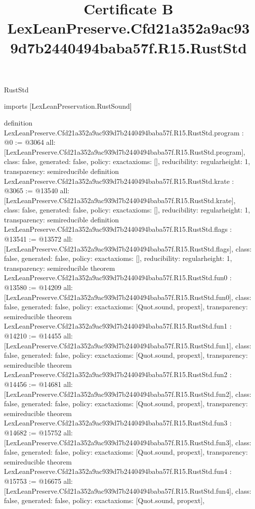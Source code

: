 \begin{lexlean}{RustStd}
\title{Certificate B LexLeanPreserve.Cfd21a352a9ac939d7b2440494baba57f.R15.RustStd}
\begin{coremodule}
imports [LexLeanPreservation.RustSound]

definition LexLeanPreserve.Cfd21a352a9ac939d7b2440494baba57f.R15.RustStd.program : @0 := @3064 {
  all: [LexLeanPreserve.Cfd21a352a9ac939d7b2440494baba57f.R15.RustStd.program],
  class: false,
  generated: false,
  policy: exact{axioms: []},
  reducibility: regular{height: 1},
  transparency: semireducible
}
definition LexLeanPreserve.Cfd21a352a9ac939d7b2440494baba57f.R15.RustStd.krate : @3065 := @13540 {
  all: [LexLeanPreserve.Cfd21a352a9ac939d7b2440494baba57f.R15.RustStd.krate],
  class: false,
  generated: false,
  policy: exact{axioms: []},
  reducibility: regular{height: 1},
  transparency: semireducible
}
definition LexLeanPreserve.Cfd21a352a9ac939d7b2440494baba57f.R15.RustStd.flags : @13541 := @13572 {
  all: [LexLeanPreserve.Cfd21a352a9ac939d7b2440494baba57f.R15.RustStd.flags],
  class: false,
  generated: false,
  policy: exact{axioms: []},
  reducibility: regular{height: 1},
  transparency: semireducible
}
theorem LexLeanPreserve.Cfd21a352a9ac939d7b2440494baba57f.R15.RustStd.fun0 : @13580 := @14209 {
  all: [LexLeanPreserve.Cfd21a352a9ac939d7b2440494baba57f.R15.RustStd.fun0],
  class: false,
  generated: false,
  policy: exact{axioms: [Quot.sound, propext]},
  transparency: semireducible
}
theorem LexLeanPreserve.Cfd21a352a9ac939d7b2440494baba57f.R15.RustStd.fun1 : @14210 := @14455 {
  all: [LexLeanPreserve.Cfd21a352a9ac939d7b2440494baba57f.R15.RustStd.fun1],
  class: false,
  generated: false,
  policy: exact{axioms: [Quot.sound, propext]},
  transparency: semireducible
}
theorem LexLeanPreserve.Cfd21a352a9ac939d7b2440494baba57f.R15.RustStd.fun2 : @14456 := @14681 {
  all: [LexLeanPreserve.Cfd21a352a9ac939d7b2440494baba57f.R15.RustStd.fun2],
  class: false,
  generated: false,
  policy: exact{axioms: [Quot.sound, propext]},
  transparency: semireducible
}
theorem LexLeanPreserve.Cfd21a352a9ac939d7b2440494baba57f.R15.RustStd.fun3 : @14682 := @15752 {
  all: [LexLeanPreserve.Cfd21a352a9ac939d7b2440494baba57f.R15.RustStd.fun3],
  class: false,
  generated: false,
  policy: exact{axioms: [Quot.sound, propext]},
  transparency: semireducible
}
theorem LexLeanPreserve.Cfd21a352a9ac939d7b2440494baba57f.R15.RustStd.fun4 : @15753 := @16675 {
  all: [LexLeanPreserve.Cfd21a352a9ac939d7b2440494baba57f.R15.RustStd.fun4],
  class: false,
  generated: false,
  policy: exact{axioms: [Quot.sound, propext]},
}
\end{coremodule}
\end{lexlean}

